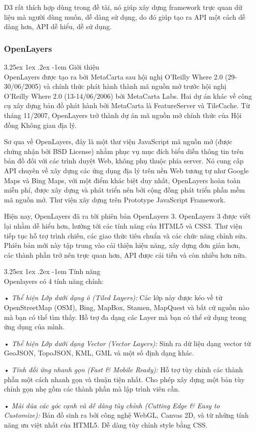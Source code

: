 \documentclass[12pt,a4paper]{article}
\makeatletter
\newcommand{\myparagraph}[1]{\paragraph{#1}\mbox{}\\} %
\renewcommand\paragraph{\@startsection{paragraph}{5}{\z@}%
  {3.25ex \@plus1ex \@minus.2ex}%
  {-1em}%
  {\normalfont\normalsize\bfseries}}
\makeatother
\begin{document}
D3 rất thích hợp dùng trong đề tài, nó giúp xây dựng framework trực quan dữ liệu mà người dùng muốn, dễ dàng sử dụng, do đó giúp tạo ra API một cách dễ dàng hơn, API dễ hiểu, dễ sử dụng.

\subsubsection{OpenLayers}
\myparagraph{Giới thiệu}
OpenLayers được tạo ra bởi MetaCarta sau hội nghị O'Reilly Where 2.0 (29-30/06/2005) và chính thức phát hành thành mã nguồn mở trước hội nghị  O'Reilly Where 2.0 (13-14/06/2006) bởi MetaCarta Labs. Hai dự án khác về công cụ xây dựng bản đồ phát hành bởi MetaCarta là FeatureServer và TileCache. Từ tháng 11/2007, OpenLayers trở thành dự án mã nguồn mở chính thức của Hội đồng Không gian địa lý.

Sơ qua về OpenLayers, đây là một thư viện JavaScript mã nguồn mở (được chứng nhận bởi BSD License) nhằm phục vụ mục đích biểu diễn thông tin trên bản đồ  đối với các trình duyệt Web, không phụ thuộc phía server. Nó cung cấp API chuyên về xây dựng các ứng dụng địa lý trên nền Web tương tự như Google Maps và Bing Maps, với một điểm khác biệt duy nhất, OpenLayers hoàn toàn miễn phí, được xây dựng và phát triển nên bởi cộng đồng phát triển phần mềm mã nguồn mở. Thư viện xây dựng trên Prototype JavaScript Framework.

Hiện nay, OpenLayers đã ra tới phiên bản OpenLayers 3. OpenLayers 3 được viết lại nhằm dễ hiểu hơn, hướng tới các tính năng của HTML5 và CSS3. Thư viện tiếp tục hỗ trợ trình chiếu, các giao thức tiêu chuẩn và các chức năng chỉnh sửa. Phiên bản mới này tập trung vào cải thiện hiệu năng, xây dựng đơn giản hơn, các thành phần trở nên trực quan hơn, API được cải tiến và còn nhiều hơn nữa.

\myparagraph{Tính năng}
Openlayers có 4 tính năng chính:
\begin{list}{}{}
\item[•] \emph{Thể hiện Lớp dưới dạng ô (Tiled Layers):} Các lớp này được kéo về từ OpenStreetMap (OSM), Bing, MapBox, Stamen, MapQuest và bất cứ nguồn nào mà bạn có thể tìm thấy. Hỗ trợ đa dạng các Layer mà bạn có thể sử dụng trong ứng dụng của mình.
\item[•] \emph{Thể hiện Lớp dưới dạng Vector (Vector Layers):} Sinh ra dữ liệu dạng vector từ GeoJSON, TopoJSON, KML, GML và một số định dạng khác.
\item[•] \emph{Tính đối ứng nhanh gọn (Fast \& Mobile Ready):} Hỗ trợ tùy chỉnh các thành phần một cách nhanh gọn và thuận tiện nhất. Cho phép xây dựng một bản tùy chỉnh gọn nhẹ gồm các thành phần mà lập trình viên cần.
\item[•] \emph{Mài dũa các góc cạnh và dễ dàng tùy chỉnh (Cutting Edge \& Easy to Customize):} Bản đồ sinh ra bởi công nghệ WebGL, Canvas 2D, và từ những tính năng ưu việt nhất của HTML5. Dễ dàng tùy chỉnh style bằng CSS.
\end{list}
\end{document}
